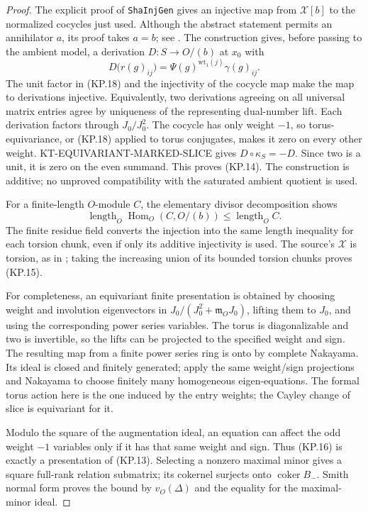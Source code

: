 \documentclass[11pt,a4paper]{article}
\theoremstyle{definition}
\begin{document}
\begin{proof}
The explicit proof of \texttt{ShaInjGen} gives an injective
map from $\mathcal X[b]$ to the normalized cocycles just used.
Although the abstract  statement permits an
annihilator $a$, its proof takes $a=b$; see
.  The construction
 gives, before passing to the
ambient model, a derivation
$D:S\to O/(b)$ at $x_0$ with
\[
 D\bigl(r(g)_{ij}\bigr)=\Psi(g)^{\mathrm{wt}_1(j)}\gamma(g)_{ij}.
                                                                  \tag{KP.18}
\]
The unit factor in (KP.18) and the injectivity of the cocycle
map make the map to derivations injective.  Equivalently, two
derivations agreeing on all universal matrix entries agree
by uniqueness of the representing dual-number lift.  Each
derivation factors through $J_0/J_0^2$.  The cocycle has only
weight $-1$, so torus-equivariance, or (KP.18) applied to
torus conjugates, makes it zero on every other weight.
KT-EQUIVARIANT-MARKED-SLICE gives $D\circ\kappa_S=-D$.
Since two is a unit, it is zero on the even summand.  This
proves (KP.14).  The construction is additive; no unproved
compatibility with the saturated ambient quotient is used.

For a finite-length $O$-module $C$, the elementary divisor
decomposition shows
\[
\operatorname{length}_O\operatorname{Hom}_O(C,O/(b))
\leq\operatorname{length}_O C.
\]
The finite residue field
converts the injection into the same length inequality for
each torsion chunk, even if only its additive injectivity is
used.  The source's $\mathcal X$ is torsion, as in
; taking the increasing union of
its bounded torsion chunks proves (KP.15).

For completeness, an equivariant finite presentation is
obtained by choosing weight and involution eigenvectors in
$J_0/(J_0^2+\mathfrak m_OJ_0)$, lifting them to $J_0$, and
using the corresponding power series variables.  The torus
is diagonalizable and two is invertible, so the lifts can be
projected to the specified weight and sign.  The resulting
map from a finite power series ring is onto by complete
Nakayama.  Its ideal is closed and finitely generated;
apply the same weight/sign projections and Nakayama to
choose finitely many homogeneous eigen-equations.  The
formal torus action here is the one induced by the entry
weights; the Cayley change of slice is equivariant for it.

Modulo the square of the augmentation ideal, an equation
can affect the odd weight $-1$ variables only if it has that
same weight and sign.  Thus (KP.16) is exactly a presentation
of (KP.13).  Selecting a nonzero maximal minor gives a
square full-rank relation submatrix; its cokernel surjects
onto $\operatorname{coker}B_-$.  Smith normal form proves
the bound by $v_O(\Delta)$ and the equality for the
maximal-minor ideal.
\end{proof}
\end{document}
